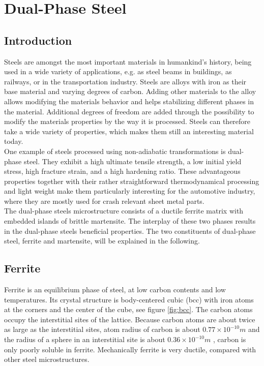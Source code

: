 \chapter{Dual-Phase Steel}
\label{cha:DualPhaseSteels}

\section{Introduction}

Steels are amongst the most important materials in humankind's history, being used in a wide variety of applications, e.g. as steel beams in buildings, as railways, or in the transportation industry. Steels are alloys with iron as their base material and varying degrees of carbon. Adding other materials to the alloy allows modifying the materials behavior and helps stabilizing different phases in the material. Additional degrees of freedom are added through the possibility to modify the materials properties by the way it is processed. Steels can therefore take a wide variety of properties, which makes them still an interesting material today. \\


One example of steels processed using non-adiabatic transformations is dual-phase steel. They exhibit a high ultimate tensile strength, a low initial yield stress, high fracture strain, and a high hardening ratio. These advantageous properties together with their rather straightforward thermodynamical processing and light weight make them particularly interesting for the automotive industry, where they are mostly used for crash relevant sheet metal parts. \\

The dual-phase steels microstructure consists of a ductile ferrite matrix with embedded islands of brittle martensite. The interplay of these two phases results in the dual-phase steels beneficial properties. The two constituents of dual-phase steel, ferrite and martensite, will be explained in the following. \\

\section{Ferrite}

Ferrite is an equilibrium phase of steel, at low carbon contents and low temperatures. Its crystal structure is body-centered cubic (bcc) with iron atoms at the corners and the center of the cube, see figure \ref{fig:bcc}. The carbon atoms occupy the interstitial sites of the lattice. Because carbon atoms are about twice as large as the interstitial sites, atom radius of carbon is about $0.77 \times 10^{-10}m$ and the radius of a sphere in an interstitial site is about $0.36\times 10^{-10}m$ \cite{Bleck}, carbon is only poorly soluble in ferrite. Mechanically ferrite is very ductile, compared with other steel microstructures.  \\

